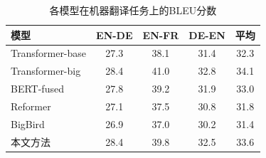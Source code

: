 \begin{table}[h]
\centering
\caption{各模型在机器翻译任务上的BLEU分数}
\label{tab:translation_results}
{\renewcommand{\arraystretch}{0.65}
\begin{tabular}{|l|c|c|c|c|}
\hline
模型 & EN-DE & EN-FR & DE-EN & 平均 \\
\hline
Transformer-base & 27.3 & 38.1 & 31.4 & 32.3 \\
Transformer-big & 28.4 & 41.0 & 32.8 & 34.1 \\
BERT-fused & 27.8 & 39.2 & 31.9 & 33.0 \\
Reformer & 27.1 & 37.5 & 30.8 & 31.8 \\
BigBird & 26.9 & 37.0 & 30.2 & 31.4 \\
\rowcolor{green!20}
本文方法 & 28.4 & 39.8 & 32.5 & 33.6 \\
\hline
\end{tabular}}
\end{table}
